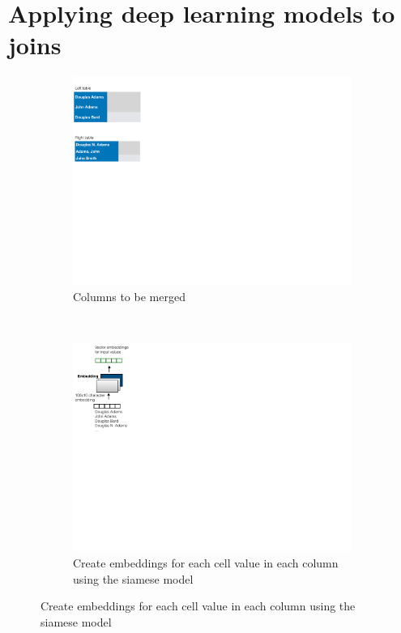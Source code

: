 \section{Applying deep learning models to joins}
\label{join_system}

\begin{figure}[htb]
    \centering
    \begin{subfigure}[t]{0.24\linewidth}
        \centering
        \includegraphics[width=.9\linewidth]{join1}
        \caption{Columns to be merged}
        \label{join1}
    \end{subfigure}%
    ~ 
    \begin{subfigure}[t]{0.24\linewidth}
        \centering 
        \includegraphics[width=.9\linewidth]{join2}
        \caption{Create embeddings for each cell value in each column using the siamese model}
        \label{join2}
    \end{subfigure}

\end{figure}
